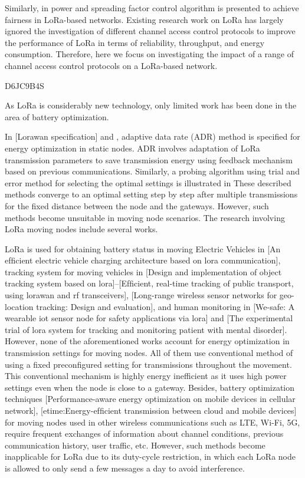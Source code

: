 Similarly,
	in \cite{reynders_power_2017} power and spreading factor control algorithm is presented to achieve fairness in LoRa-based networks.
Existing research work on LoRa has largely ignored the investigation of different channel access control protocols to improve the performance of LoRa in terms of reliability,
	throughput,
	and energy consumption.
Therefore,
	here we focus on investigating the impact of a range of channel access control protocols on a LoRa-based network.

\cite{gupta_battery_2019} D6JC9B4S

As LoRa is considerably new technology,
	only limited work has been done in the area of battery optimization.

In [Lorawan speciﬁcation] and \cite{hauser_proposal_2017},
	adaptive data rate (ADR) method is specified for energy optimization in static nodes.
ADR involves adaptation of LoRa transmission parameters to save transmission energy using feedback mechanism based on previous communications.
Similarly,
	a probing algorithm using trial and error method for selecting the optimal settings is illustrated in \cite{bor_lora_2017} These described methods converge to an optimal setting step by step after multiple transmissions for the fixed distance between the node and the gateways.
However,
	such methods become unsuitable in moving node scenarios.
The research involving LoRa moving nodes include several works.

LoRa is used for obtaining battery status in moving Electric Vehicles in [An efﬁcient electric vehicle charging architecture based on lora communication],
	tracking system for moving vehicles in [Design and implementation of object tracking system based on lora]–[Efﬁcient,
	real-time tracking of public transport,
	using lorawan and rf transceivers],
	[Long-range wireless sensor networks for geo-location tracking:
	Design and evaluation],
	and human monitoring in [We-safe:
	A wearable iot sensor node for safety applications via lora] and [The experimental trial of lora system for tracking and monitoring patient with mental disorder].
However,
	none of the aforementioned works account for energy optimization in transmission settings for moving nodes.
All of them use conventional method of using a fixed preconfigured setting for transmissions throughout the movement.
This conventional mechanism is highly energy inefficient as it uses high power settings even when the node is close to a gateway.
Besides,
	battery optimization techniques [Performance-aware energy optimization on mobile devices in cellular network],
	[etime:Energy-efﬁcient transmission between cloud and mobile devices] for moving nodes used in other wireless communications such as LTE,
	Wi-Fi, 5G,
	require frequent exchanges of information about channel conditions,
	previous communication history,
	user traffic,
	etc.
However,
	such methods become inapplicable for LoRa due to its duty-cycle restriction,
	in which each LoRa node is allowed to only send a few messages a day to avoid interference.

